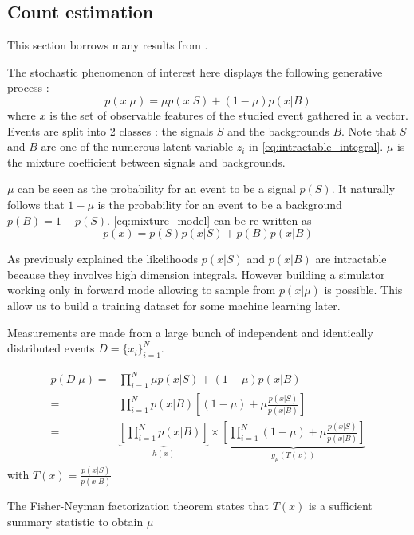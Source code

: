 \subsection{Count estimation} %
\label{sub:count_estimation}


This section borrows many results from \cite{Neal:2007zz}.

The stochastic phenomenon of interest here displays the following generative process :
\begin{equation}
	\label{eq:mixture_model}
	p(x|\mu) = \mu p(x|S) + (1-\mu) p(x|B)
\end{equation}
where $x$ is the set of observable features of the studied event gathered in a vector.
Events are split into 2 classes : the signals $S$ and the backgrounds $B$.
Note that $S$ and $B$ are one of the numerous latent variable $z_i$ in \autoref{eq:intractable_integral}.
$\mu$ is the mixture coefficient between signals and backgrounds.

$\mu$ can be seen as the probability for an event to be a signal $p(S)$. 
It naturally follows that $1-\mu$ is the probability for an event to be a background $p(B)=1-p(S)$.
\autoref{eq:mixture_model} can be re-written as
\begin{equation}
	p(x) = p(S)p(x|S) + p(B)p(x|B)
\end{equation}

As previously explained the likelihoods $p(x|S)$ and $p(x|B)$ are intractable because they involves high dimension integrals.
However building a simulator working only in forward mode allowing to sample from $p(x|\mu)$ is possible.
This allow us to build a training dataset for some machine learning later.

Measurements are made from a large bunch of independent and identically distributed events $D=\{x_i\}_{i=1}^N$.

\begin{align*}
	p(D|\mu) =& \prod_{i=1}^N \mu p(x|S) + (1-\mu) p(x|B) \\
	       =& \prod_{i=1}^N p(x|B) \left [(1-\mu) + \mu \frac{p(x|S)}{p(x|B)} \right ]\\
\label{eq:Fisher-Neyman}
	       =& \underbrace{\left[ \prod_{i=1}^N p(x|B) \right ]}_{h(x)} \times 
	       \underbrace{\left [\prod_{i=1}^N (1-\mu) + \mu \frac{p(x|S)}{p(x|B)} \right ]}_{g_\mu(T(x))}
\end{align*}
with $T(x) = \frac{p(x|S)}{p(x|B)} $

The Fisher-Neyman factorization theorem \needcite states that $T(x)$ is a sufficient summary statistic to obtain $\mu$

